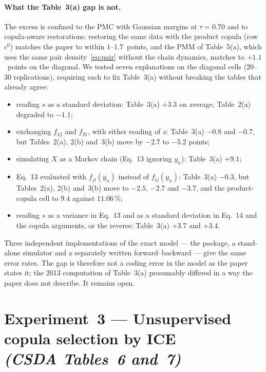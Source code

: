 \documentclass[11pt,a4paper]{article}
\begin{document}
\paragraph{What the Table~3(a) gap is not.} The excess is confined to the
PMC with Gaussian margins at $\tau=0.70$ and to copula-aware restorations:
restoring the same data with the product copula (row $c^0$) matches the
paper to within $1$--$1.7$~points, and the PMM of Table~5(a), which uses the
same pair density~\eqref{eq:pair} without the chain dynamics, matches to
$+1.1$~points on the diagonal. We tested seven explanations on the diagonal
cells (20--30 replications), requiring each to fix Table~3(a) without
breaking the tables that already agree:
\begin{itemize}
  \item reading $s$ as a standard deviation: Table~3(a) $+3.3$ on average,
        Table~2(a) degraded to $-1.1$;
  \item exchanging $f_{12}$ and $f_{21}$, with either reading of $s$:
        Table~3(a) $-0.8$ and $-0.7$, but Tables~2(a), 2(b) and~3(b) move
        by $-2.7$ to $-5.2$ points;
  \item simulating $X$ as a Markov chain (Eq.~13 ignoring $y_n$): Table~3(a)
        $+9.1$;
  \item Eq.~13 evaluated with $f_{ji}(y_n)$ instead of $f_{ij}(y_n)$:
        Table~3(a) $-0.3$, but Tables~2(a), 2(b) and~3(b) move to $-2.5$,
        $-2.7$ and $-3.7$, and the product-copula cell to $9.4$ against
        $11.06\,\%$;
  \item reading $s$ as a variance in Eq.~13 and as a standard deviation in
        Eq.~14 and the copula arguments, or the reverse: Table~3(a) $+3.7$
        and $+3.4$.
\end{itemize}
Three independent implementations of the exact model --- the package, a
stand-alone simulator and a separately written forward--backward --- give the
same error rates. The gap is therefore not a coding error in the model as
the paper states it; the 2013 computation of Table~3(a) presumably differed
in a way the paper does not describe. It remains open.

\section{Experiment~3 --- Unsupervised copula selection by ICE\\
        \emph{(CSDA Tables~6 and~7)}}\label{sec:exp3}
\end{document}
